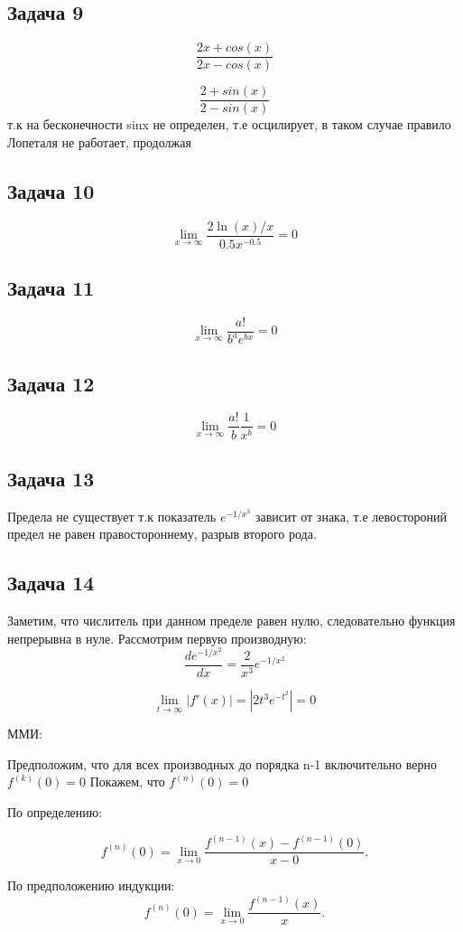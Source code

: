 \documentclass[a4paper,12pt]{article}
\begin{document}
\subsection{Задача 9}
\[
\frac{2x + cos(x)}{2x-cos(x)}
\]

\[
\frac{2 + sin(x)}{2-sin(x)}
\]
т.к на бесконечности sinx не определен, т.е осцилирует, в таком случае правило Лопеталя не работает, продолжая

\subsection{Задача 10}
\[
\lim_{x \to \infty} \frac{2\ln(x)/x}{0.5x^{-0.5}} = 0 
\]

\subsection{Задача 11}
\[
\lim_{x \to \infty}\frac{a!}{b^ae^{bx}} = 0
\]

\subsection{Задача 12}
\[
\lim_{x \to \infty} \frac{a!}{b} \frac{1}{x^b} = 0
\]

\subsection{Задача 13}

Предела не существует т.к показатель $e^{-1/x^3}$ зависит от знака, т.е левостороний предел не равен правостороннему, разрыв второго рода.

\subsection{Задача 14}
Заметим, что числитель при данном пределе равен нулю, следовательно функция непрерывна в нуле. Рассмотрим первую производную: 
\[
\frac{de^{-1/x^2}}{dx} = \frac{2}{x^3}e^{-1/x^2}
\]

\[
\lim_{t \to \infty}|f'(x)| = |2t^3e^{-t^2}| = 0
\]

ММИ:

Предположим, что для всех производных до порядка n-1 включительно верно $f^{(k)}(0)=0$ Покажем, что $f^{(n)}(0) = 0$

По определению: 

\[
f^{(n)}(0) = \lim_{x \to 0} \frac{f^{(n-1)}(x) - f^{(n-1)}(0)}{x-0}.
\]

По предположению индукции:
\[
f^{(n)}(0) = \lim_{x \to 0}\frac{f^{(n-1)}(x)}{x}.
\]
\end{document}
